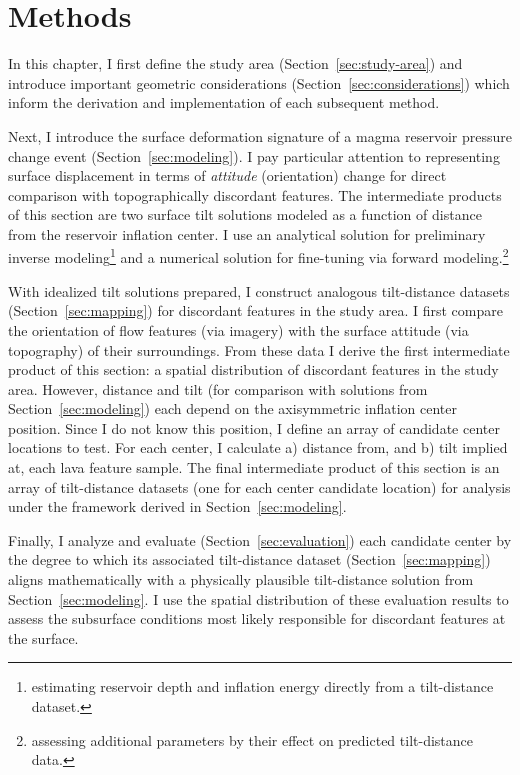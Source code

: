 \chapter{Methods}\label{cha:methods}

In this chapter, I first define the study area (Section~\ref{sec:study-area}) and introduce important geometric considerations (Section~\ref{sec:considerations}) which inform the derivation and implementation of each subsequent method.

Next, I introduce the surface deformation signature of a magma reservoir pressure change event (Section~\ref{sec:modeling}). I pay particular attention to representing surface displacement in terms of \emph{attitude} (orientation) change for direct comparison with topographically discordant features. The intermediate products of this section are two surface tilt solutions modeled as a function of distance from the reservoir inflation center. I use an analytical solution for preliminary inverse modeling\footnote{estimating reservoir depth and inflation energy directly from a tilt-distance dataset.} and a numerical solution for fine-tuning via forward modeling.\footnote{assessing additional parameters by their effect on predicted tilt-distance data.}

With idealized tilt solutions prepared, I construct analogous tilt-distance datasets (Section~\ref{sec:mapping}) for discordant features in the study area. I first compare the orientation of flow features (via imagery) with the surface attitude (via topography) of their surroundings. From these data I derive the first intermediate product of this section: a spatial distribution of discordant features in the study area. However, distance and tilt (for comparison with solutions from Section~\ref{sec:modeling}) each depend on the axisymmetric inflation center position. Since I do not know this position, I define an array of candidate center locations to test. For each center, I calculate a) distance from, and b) tilt implied at, each lava feature sample. The final intermediate product of this section is an array of tilt-distance datasets (one for each center candidate location) for analysis under the framework derived in Section~\ref{sec:modeling}.

Finally, I analyze and evaluate (Section~\ref{sec:evaluation}) each candidate center by the degree to which its associated tilt-distance dataset (Section~\ref{sec:mapping}) aligns mathematically with a physically plausible tilt-distance solution from Section~\ref{sec:modeling}. I use the spatial distribution of these evaluation results to assess the subsurface conditions most likely responsible for discordant features at the surface.





